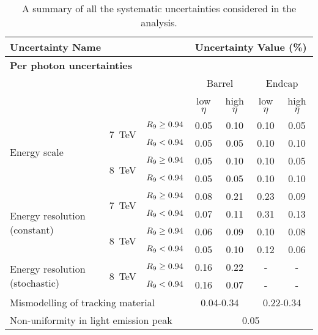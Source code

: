 \begin{table}[h!]
\caption{A summary of all the systematic uncertainties considered in the analysis.}
\footnotesize
\begin{tabular} { l | r r | c c c c }

\hline
\multicolumn{3}{l}{\textbf{Uncertainty Name}} & \multicolumn{4}{c}{\textbf{Uncertainty Value (\%)}} \\   
\hline
\hline
\multicolumn{7}{l}{\textbf{Per photon uncertainties}} \\ 
\hline
\multicolumn{3}{l}{}   & \multicolumn{2}{c}{Barrel} & \multicolumn{2}{c}{Endcap} \\
\multicolumn{3}{l}{}   & low $\eta$ & high $\eta$ & low $\eta$ & high $\eta$ \\ 
\hline
\multirow{4}{*}{Energy scale}         & \multirow{2}{*}{7~TeV}    & $R_{9} \geq 0.94$ & 0.05 & 0.10 & 0.10 & 0.05 \\
                                      &     & $R_{9} < 0.94$ & 0.05 & 0.05 & 0.10 & 0.10 \\
                                      & \multirow{2}{*}{8~TeV}    & $R_{9} \geq 0.94$ & 0.05 & 0.10 & 0.10 & 0.05 \\
                                      &          & $R_{9} < 0.94$ & 0.05 & 0.05 & 0.10 & 0.10 \\
\hline
\multirow{4}{*}{Energy resolution (constant)}         & \multirow{2}{*}{7~TeV}  & $R_{9} \geq 0.94$ & 0.08 & 0.21 & 0.23 & 0.09 \\
                                                      &                         & $R_{9} < 0.94$ & 0.07 & 0.11 & 0.31 & 0.13 \\
                                                      & \multirow{2}{*}{8~TeV}  & $R_{9} \geq 0.94$ & 0.06 & 0.09 & 0.10 & 0.08 \\
                                                      &                         & $R_{9} < 0.94$ & 0.05 & 0.10 & 0.12 & 0.06 \\
\hline
\multirow{2}{*}{Energy resolution (stochastic)}  & \multirow{2}{*}{8~TeV}  & $R_{9} \geq 0.94$ & 0.16 & 0.22 & - & - \\
                                                      &                         & $R_{9} < 0.94$ & 0.16 & 0.07 & - & - \\
\hline
\multicolumn{3}{l|}{Mismodelling of tracking material}                     & \multicolumn{2}{c}{0.04-0.34} & \multicolumn{2}{c}{0.22-0.34} \\
\multicolumn{3}{l|}{Non-uniformity in light emission peak}                 & \multicolumn{4}{c}{0.05} \\

\end{tabular}
\end{table}
